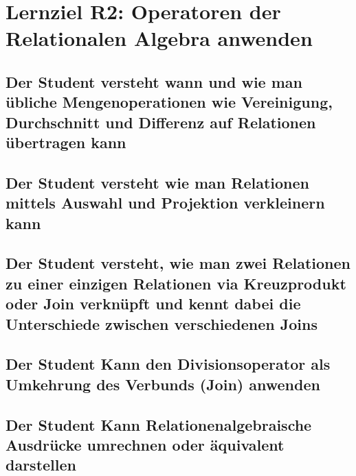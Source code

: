 \section{Lernziel R2: Operatoren der Relationalen Algebra anwenden}

\subsection{Der Student versteht wann und wie man übliche Mengenoperationen wie Vereinigung, Durchschnitt und Differenz auf Relationen übertragen kann}

\subsection{Der Student versteht wie man Relationen mittels Auswahl und Projektion verkleinern kann}

\subsection{Der Student versteht, wie man zwei Relationen zu einer einzigen Relationen via Kreuzprodukt oder Join verknüpft und kennt dabei die Unterschiede zwischen verschiedenen Joins}

\subsection{Der Student Kann den Divisionsoperator als Umkehrung des Verbunds (Join) anwenden}

\subsection{Der Student Kann Relationenalgebraische Ausdrücke umrechnen oder äquivalent darstellen}